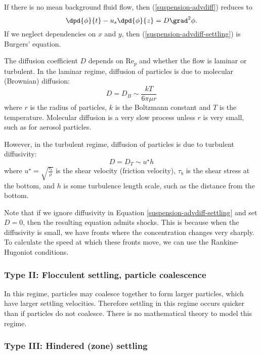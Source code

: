 If there is no mean background fluid flow, then (\ref{suspension-advdiff}) reduces to
\begin{equation}
    \dpd{\phi}{t} - u_s\dpd{\phi}{z} = D\grad^2\phi.
    \label{suspension-advdiff-settling}
\end{equation}
If we neglect dependencies on $x$ and $y$, then (\ref{suspension-advdiff-settling}) is Burgers' equation. 

The diffusion coefficient $D$ depends on $\mathrm{Re}_p$ and whether the flow is laminar or turbulent. In the laminar regime, diffusion of particles is due to molecular (Brownian) diffusion: 
\begin{equation}
    D = D_B \sim \frac{kT}{6\pi\mu r}
\end{equation}
where $r$ is the radius of particles, $k$ is the Boltzmann constant and $T$ is the temperature. Molecular diffusion is a very slow process unless $r$ is very small, such as for aerosol particles.

However, in the turbulent regime, diffusion of particles is due to turbulent diffusivity:
\begin{equation}
    D = D_T \sim u^\star h
\end{equation}
where $u^\star = \sqrt{\frac{\tau_b}{\rho}}$ is the shear velocity (friction velocity), $\tau_b$ is the shear stress at the bottom, and $h$ is some turbulence length scale, such as the distance from the bottom.

Note that if we ignore diffusivity in Equation \ref{suspension-advdiff-settling} and set $D=0$, then the resulting equation admits shocks. This is because when the diffusivity is small, we have fronts where the concentration changes very sharply. To calculate the speed at which these fronts move, we can use the Rankine-Hugoniot conditions.

\subsubsection{Type II: Flocculent settling, particle coalescence}

In this regime, particles may coalesce together to form larger particles, which have larger settling velocities. Therefore settling in this regime occurs quicker than if particles do not coalesce. There is no mathematical theory to model this regime.

\subsubsection{Type III: Hindered (zone) settling}

